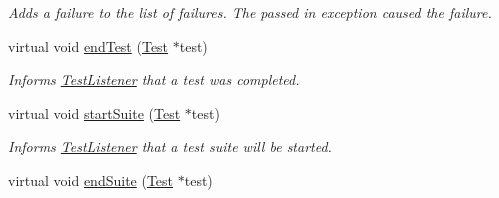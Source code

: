 \begin{DoxyCompactItemize}
\begin{DoxyCompactList}\small\item\em Adds a failure to the list of failures. The passed in exception caused the failure. \end{DoxyCompactList}\item 
\hypertarget{class_test_result_abad5c059d9f01f251057c6065a5c35b3}{virtual void \hyperlink{class_test_result_abad5c059d9f01f251057c6065a5c35b3}{end\+Test} (\hyperlink{class_test}{Test} $\ast$test)}\label{class_test_result_abad5c059d9f01f251057c6065a5c35b3}

\begin{DoxyCompactList}\small\item\em Informs \hyperlink{class_test_listener}{Test\+Listener} that a test was completed. \end{DoxyCompactList}\item 
\hypertarget{class_test_result_a9e21095aa704141c285819b99785326f}{virtual void \hyperlink{class_test_result_a9e21095aa704141c285819b99785326f}{start\+Suite} (\hyperlink{class_test}{Test} $\ast$test)}\label{class_test_result_a9e21095aa704141c285819b99785326f}

\begin{DoxyCompactList}\small\item\em Informs \hyperlink{class_test_listener}{Test\+Listener} that a test suite will be started. \end{DoxyCompactList}\item 
\hypertarget{class_test_result_acacd853a4392a0473b3407051d79d471}{virtual void \hyperlink{class_test_result_acacd853a4392a0473b3407051d79d471}{end\+Suite} (\hyperlink{class_test}{Test} $\ast$test)}\label{class_test_result_acacd853a4392a0473b3407051d79d471}


\end{DoxyCompactItemize}
